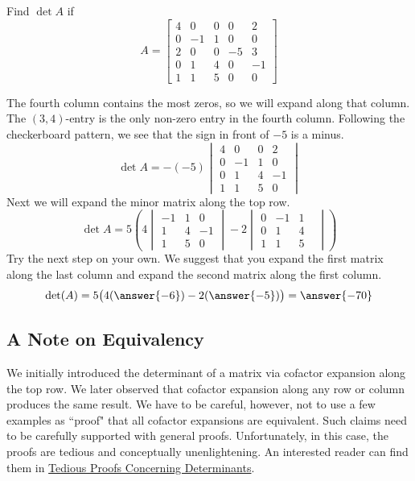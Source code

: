 \documentclass{ximera}
\begin{document}
\begin{example}\label{ex:laplace2}
Find $\det{A}$ if
$$A=\begin{bmatrix}4&0&0&0&2\\0&-1&1&0&0\\2&0&0&-5&3\\0&1&4&0&-1\\1&1&5&0&0\end{bmatrix}$$

\begin{explanation}
The fourth column contains the most zeros, so we will expand along that column.  The  $(3, 4)$-entry is the only non-zero entry in the fourth column.  Following the checkerboard pattern, we see that the sign in front of $-5$ is a minus.  
$$\det{A}=-(-5)\begin{vmatrix}4&0&0&2\\0&-1&1&0\\0&1&4&-1\\1&1&5&0\end{vmatrix}
$$
Next we will expand the minor matrix along the top row.
$$\det{A}=5\left(4\begin{vmatrix}-1&1&0\\1&4&-1\\1&5&0\end{vmatrix}-2\begin{vmatrix}0&-1&1\\0&1&4&\\1&1&5\end{vmatrix}\right)$$
Try the next step on your own.  We suggest that you expand the first matrix along the last column and expand the second matrix along the first column.
$$\det(A)=5\big(4(\answer{-6})-2(\answer{-5})\big)=\answer{-70}$$
\end{explanation}
\end{example}

\subsection*{A Note on Equivalency}
We initially introduced the determinant of a matrix via cofactor expansion along the top row.  We later observed that cofactor expansion along any row or column produces the same result.  We have to be careful, however, not to use a few examples as ``proof" that all cofactor expansions are equivalent.  Such claims need to be carefully supported with general proofs.  Unfortunately, in this case, the proofs are tedious and conceptually unenlightening.  An interested reader can find them in \href{\xmbaseurl/DET-0050/main}{Tedious Proofs Concerning Determinants}.
\end{document}
